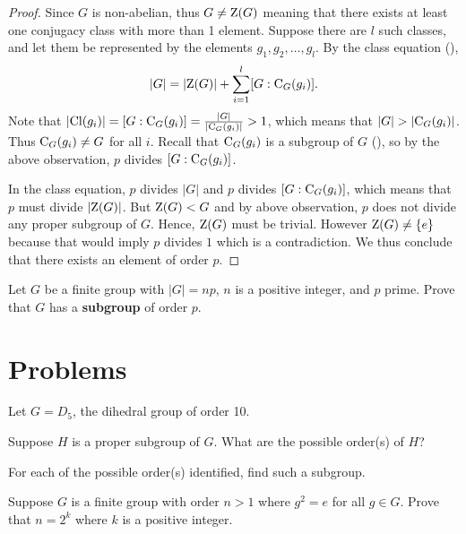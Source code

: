 \begin{proof}
    Since $G$ is non-abelian, thus $G \neq \mathrm{Z}(G)$ meaning that there exists at least one conjugacy class with more than 1 element. Suppose there are $l$ such classes, and let them be represented by the elements $g_1, g_2, \dots, g_l$. By the class equation (),
    \[
        |G| = |\mathrm{Z}(G)| + \sum_{i=1}^l [G:\mathrm{C}_{G}(g_i)].
    \]
    Note that $|\mathrm{Cl}(g_i)| = [G:\mathrm{C}_{G}(g_i)] = \frac{|G|}{|\mathrm{C}_{G}(g_i)|} > 1$, which means that $|G| > |\mathrm{C}_{G}(g_i)|$. Thus $\mathrm{C}_{G}(g_i) \neq G$ for all $i$. Recall that $\mathrm{C}_{G}(g_i)$ is a subgroup of $G$ (), so by the above observation, $p$ divides $[G:\mathrm{C}_{G}(g_i)]$.

    In the class equation, $p$ divides $|G|$ and $p$ divides $[G:\mathrm{C}_{G}(g_i)]$, which means that $p$ must divide $|\mathrm{Z}(G)|$. But $\mathrm{Z}(G) < G$ and by above observation, $p$ does not divide any proper subgroup of $G$. Hence, $\mathrm{Z}(G)$ must be trivial. However $\mathrm{Z}(G) \neq \{e\}$ because that would imply $p$ divides $1$ which is a contradiction. We thus conclude that there exists an element of order $p$.
\end{proof}

\begin{exercise}\label{exercise-group-of-order-multiple-of-prime-has-subgroup-of-prime-order}
    Let $G$ be a finite group with $|G| = np$, $n$ is a positive integer, and $p$ prime. Prove that $G$ has a \textbf{subgroup} of order $p$.
\end{exercise}

\newpage

\section{Problems}
\begin{problem}
    Let $G = D_5$, the dihedral group of order 10.
    \begin{partquestions}{\alph*}
        \item Suppose $H$ is a proper subgroup of $G$. What are the possible order(s) of $H$?
        \item For each of the possible order(s) identified, find such a subgroup.
    \end{partquestions}
\end{problem}

\begin{problem}
    Suppose $G$ is a finite group with order $n > 1$ where $g^2 = e$ for all $g \in G$. Prove that $n = 2^k$ where $k$ is a positive integer.
\end{problem}

